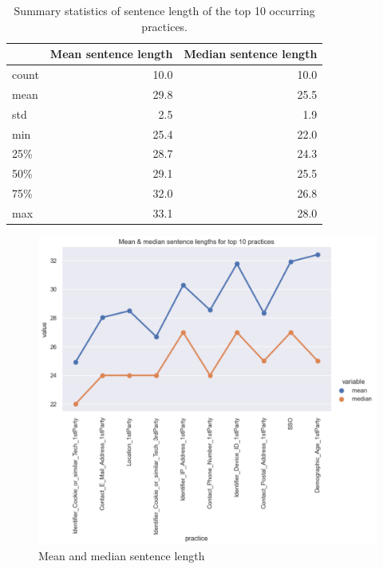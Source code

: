 \begin{table}[!ht]
	\centering
	\begin{tabular}{lrr}
		\toprule
		{} &  Mean sentence length &  Median sentence length \\
		\midrule
		count &             10.0 &               10.0 \\
		mean  &             29.8 &               25.5 \\
		std   &              2.5 &                1.9 \\
		min   &             25.4 &               22.0 \\
		25\%   &             28.7 &               24.3 \\
		50\%   &             29.1 &               25.5 \\
		75\%   &             32.0 &               26.8 \\
		max   &             33.1 &               28.0 \\
		\bottomrule
	\end{tabular}
	\caption{Summary statistics of sentence length of the top 10 occurring practices.}
	\label{tab:summary_top_10_practices}
\end{table}

\begin{figure}[!ht]
	\centering
	\includegraphics[width=1\textwidth]{figures/eda_mean_median.png}      
    \caption{Mean and median sentence length}
    \label{fig:graph_sentence_length}
\end{figure}


